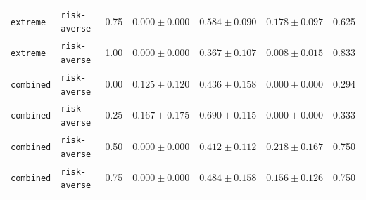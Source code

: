 \documentclass{article}
\begin{document}
\begin{center}
\begin{tabular}{lllcccc}
\texttt{extreme} & \texttt{risk-averse} & 0.75 & $0.000 \pm 0.000$ & $0.584 \pm 0.090$ & $0.178 \pm 0.097$ & 0.625 \\
\texttt{extreme} & \texttt{risk-averse} & 1.00 & $0.000 \pm 0.000$ & $0.367 \pm 0.107$ & $0.008 \pm 0.015$ & 0.833 \\
\texttt{combined} & \texttt{risk-averse} & 0.00 & $0.125 \pm 0.120$ & $0.436 \pm 0.158$ & $0.000 \pm 0.000$ & 0.294 \\
\texttt{combined} & \texttt{risk-averse} & 0.25 & $0.167 \pm 0.175$ & $0.690 \pm 0.115$ & $0.000 \pm 0.000$ & 0.333 \\
\texttt{combined} & \texttt{risk-averse} & 0.50 & $0.000 \pm 0.000$ & $0.412 \pm 0.112$ & $0.218 \pm 0.167$ & 0.750 \\
\texttt{combined} & \texttt{risk-averse} & 0.75 & $0.000 \pm 0.000$ & $0.484 \pm 0.158$ & $0.156 \pm 0.126$ & 0.750 \\
\bottomrule
\end{tabular}
\end{center}
\end{document}

